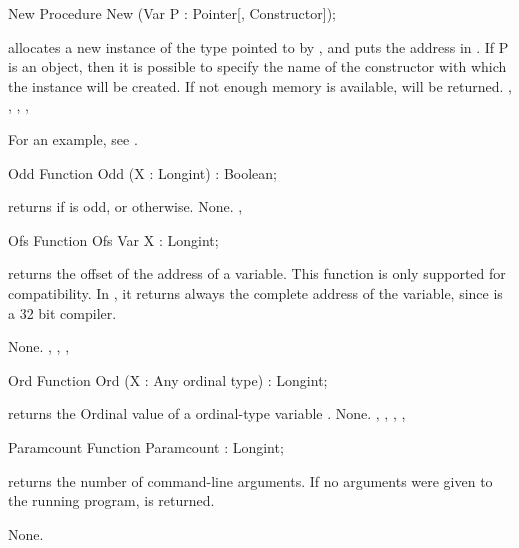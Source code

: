 \documentclass{report}
\begin{document}
\begin{procedure}{New}
\Declaration
Procedure New (Var P : Pointer[, Constructor]);

\Description
{} allocates a new instance of the type pointed to by , and
puts the address in .
If P is an object, then it is possible to
specify the name of the constructor with which the instance will be created.
\Errors
If not enough memory is available,  will be returned.
\SeeAlso
{}, , , ,
\end{procedure}
For an example, see .
\begin{function}{Odd}
\Declaration
Function Odd (X : Longint) : Boolean;

\Description
{} returns  if  is odd, or  otherwise.
\Errors
None.
\SeeAlso
{}, 
\end{function}


\begin{function}{Ofs}
\Declaration
Function Ofs Var X : Longint;

\Description
{} returns the offset of the address of a variable.
This function is only supported for compatibility. In \fpc, it
returns always the complete address of the variable, since \fpc is a 32 bit
compiler.

\Errors
None.
\SeeAlso
{}, , , 
\end{function}


\begin{function}{Ord}
\Declaration
Function Ord (X : Any ordinal type) : Longint;

\Description
{} returns the Ordinal value of a ordinal-type variable .
\Errors
None.
\SeeAlso
{}, , , , 
\end{function}


\begin{function}{Paramcount}
\Declaration
Function Paramcount  : Longint;

\Description
{} returns the number of command-line arguments. If no
arguments were given to the running program,  is returned.

\Errors
None.
\SeeAlso
{}
\end{function}
\end{document}
